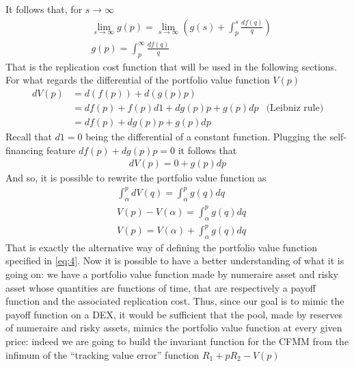 \documentclass[12pt]{article}
\begin{document}
It follows that, for $s\to\infty$ 
\begin{align*}
    &\lim_{s\to\infty}g(p) = \lim_{s\to\infty} \left(g(s) +\int_p^s  \frac{df(q)}{q}\right)\\
    &g(p) = \int_p^\infty  \frac{df(q)}{q} 
\end{align*}
That is the replication cost function that will be used in the following sections. \newline
For what regards the differential of the portfolio value function $V(p)$
\begin{align*}
    dV(p) &= d(f(p))+d(g(p)p)\\
    & = df(p)+f(p)d1+dg(p)p+g(p)dp&\text{(Leibniz rule)}\\
    &=df(p)+dg(p)p+g(p)dp
\end{align*}
Recall that $d1=0$ being the differential of a constant function. Plugging the self-financing feature $df(p)+dg(p)p=0$ it follows that 
\begin{align*}
    dV(p) = 0 + g(p)dp
\end{align*}
And so, it is possible to rewrite the portfolio value function as 
\begin{align*}
    &\int_\alpha^p dV(q) = \int_\alpha^p g(q) dq\\
    & V(p)-V(\alpha) =  \int_\alpha^p g(q) dq\\
    & V(p) = V(\alpha) + \int_\alpha^p g(q) dq
\end{align*} 
That is exactly the alternative way of defining the portfolio value function specified in \eqref{eq:4}.\newline\newline
Now it is possible to have a better understanding of what it is going on: we have a portfolio value function made by numeraire asset and risky asset whose quantities are functions of time, that are respectively a payoff function and the associated replication cost. \newline
Thus, since our goal is to mimic the payoff function on a DEX, it would be sufficient that the pool, made by reserves of numeraire and risky assets, mimics the portfolio value function at every given price: indeed we are going to build the invariant function for the CFMM from the infimum of the ``tracking value error'' function $R_1+pR_2-V(p)$
\end{document}
